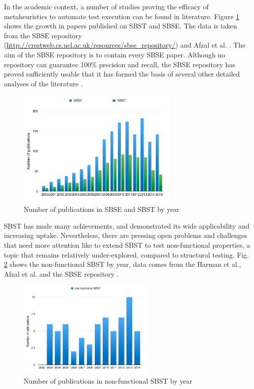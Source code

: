 \documentclass[espaco=umemeio,chapter=TITLE,twoside,openright]{abnt}
\begin{document}
In the academic context, a number of studies proving the efficacy of metaheuristics to automate test execution can be found in literature. Figure \ref{fig:sbsesbst}  shows the growth in papers published on SBST and SBSE. The data is taken from the SBSE repository (\url{http://crestweb.cs.ucl.ac.uk/resources/sbse_repository/}) and Afzal et al. \cite{Afzal2009a} \cite{Harman2015}.
The aim of the SBSE repository is to contain every SBSE paper. Although no repository can guarantee 100\% precision and recall, the SBSE repository has proved sufficiently usable that it has formed the basis of several other detailed analyses of the literature \cite{Harman2015}.


\begin{figure}[h]
\centering
\includegraphics[width=0.7\textwidth]{./images/publications1.png}
\caption{Number of publications in SBSE and SBST by year \cite{Afzal2009a} \cite{Harman2015}}
\label{fig:sbsesbst}
\end{figure}

SBST has made many achievements, and demonstrated its wide applicability and increasing uptake. Nevertheless, there are pressing open problems and challenges that need more attention like to extend SBST to test non-functional properties, a topic that remains relatively under-explored, compared to structural testing.  Fig. \ref{fig:nonfunctional} shows the non-functional SBST by year, data comes from the Harman et al., Afzal et al. and the SBSE repository \cite{Aleti2016} \cite{Harman2015}.


\begin{figure}[h]
\centering
\includegraphics[width=0.6\textwidth]{./images/nonfunctional.png}
\caption{Number of publications in non-functional SBST by year \cite{Afzal2009a} \cite{Harman2015} }
\label{fig:nonfunctional}
\end{figure}
\end{document}
